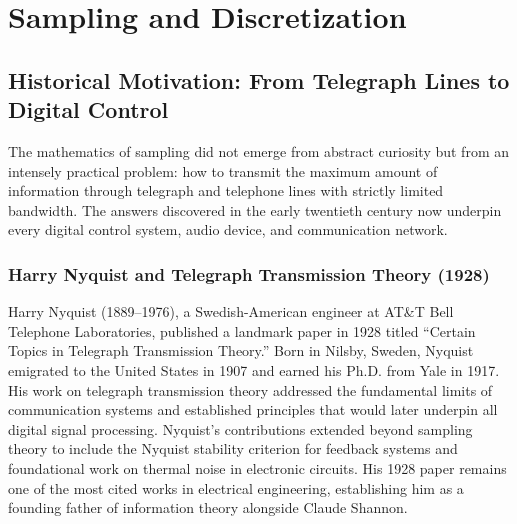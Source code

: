 
\chapter{Sampling and Discretization}
\label{ch:sampling_discretization}


\section{Historical Motivation: From Telegraph Lines to Digital Control}
\label{sec:sampling_history}

The mathematics of sampling did not emerge from abstract curiosity but from an intensely practical problem: how to transmit the maximum amount of information through telegraph and telephone lines with strictly limited bandwidth. The answers discovered in the early twentieth century now underpin every digital control system, audio device, and communication network.

\subsection{Harry Nyquist and Telegraph Transmission Theory (1928)}
\label{subsec:nyquist}

\begin{historicalbox}
Harry Nyquist (1889--1976), a Swedish-American engineer at AT\&T Bell Telephone Laboratories, published a landmark paper in 1928 titled ``Certain Topics in Telegraph Transmission Theory.'' Born in Nilsby, Sweden, Nyquist emigrated to the United States in 1907 and earned his Ph.D. from Yale in 1917. His work on telegraph transmission theory addressed the fundamental limits of communication systems and established principles that would later underpin all digital signal processing. Nyquist's contributions extended beyond sampling theory to include the Nyquist stability criterion for feedback systems and foundational work on thermal noise in electronic circuits. His 1928 paper remains one of the most cited works in electrical engineering, establishing him as a founding father of information theory alongside Claude Shannon.
\end{historicalbox}

